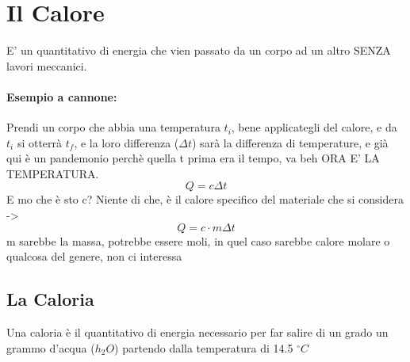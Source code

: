 \documentclass[12pt, a4paper, openany, oneside]{book}
\begin{document}
\section{Il Calore}
E' un quantitativo di energia che vien passato da un corpo ad un altro SENZA
lavori meccanici. 
\paragraph{Esempio a cannone: }
Prendi un corpo che abbia una temperatura $t_{i}$, bene applicategli del calore,
e da $t_{i}$ si otterrà $t_{f}$, e la loro differenza ($\Delta t$) sarà la differenza
di temperature, e già qui è un pandemonio perchè quella t prima era il tempo, 
va beh ORA E' LA TEMPERATURA.
\[
Q = c \Delta t
\] 
E mo che è sto c? Niente di che, è il calore specifico del materiale che si 
considera ->
\[
Q = c\cdot m  \Delta t
\]	
m sarebbe la massa, potrebbe essere moli, in quel caso sarebbe calore molare
o qualcosa del genere, non ci interessa
\subsection{La Caloria}
Una caloria è il quantitativo di energia necessario per far salire di un grado
un grammo d'acqua ($h_{2}O$) partendo dalla temperatura di 14.5 $^{\circ}C$
\end{document}
